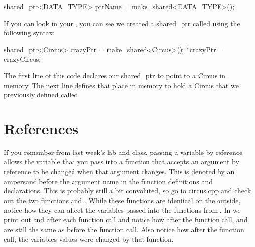 \documentclass{tufte-handout}
\begin{document}
\begin{Code}
shared_ptr<DATA_TYPE> ptrName = make_shared<DATA_TYPE>();
\end{Code}



If you can look in your , you can see we created a shared\_ptr  called  using the following syntax:

\begin{Code}
shared_ptr<Circus> crazyPtr = make_shared<Circus>();
*crazyPtr = crazyCircus;
\end{Code}

The first line of this code declares our shared\_ptr to point to a Circus in memory.  The next line defines that place in memory to hold a Circus that we previously defined called 

\section{References}

If you remember from last week's lab and class, passing a variable by reference allows the variable that you pass into a function that accepts an argument by reference to be changed when that argument changes.
This is denoted by an ampersand before the argument name in the function definitions and declarations.
This is probably still a bit convoluted, so go to circus.cpp and check out the two functions  and .  
While these functions are identical on the outside, notice how they can affect the variables passed into the functions from . 
In  we print out  and  after each function call and notice how after the  function call,  and  are still the same as before the function call.
Also notice how after the  function call, the variables values were changed by that function.
\end{document}
